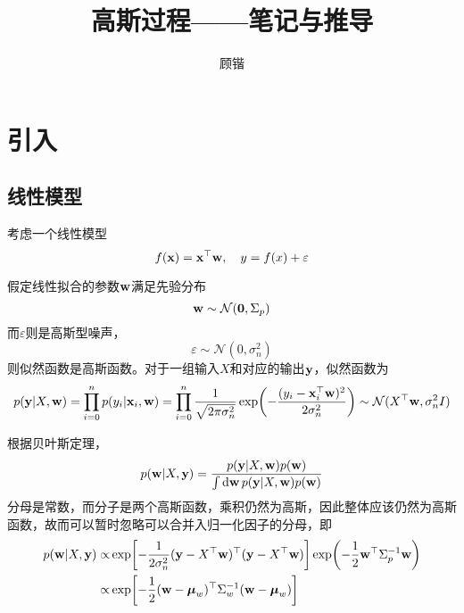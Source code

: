 \documentclass[12pt,UTF8]{article}
\begin{document}
    \title{高斯过程——笔记与推导}
    \author{顾锴}
    \maketitle

    \section{引入}
        \subsection{线性模型}
            考虑一个线性模型
            \begin{equation}
                f(\vb{x})=\vb{x}^\top\vb{w}\qc y=f(x)+\varepsilon
            \end{equation}\par
            假定线性拟合的参数$\vb{w}$满足先验分布
            \begin{equation}
                \vb{w}\sim\mathcal{N}(\vb{0},\Sigma_p)
            \end{equation}
            而$\varepsilon$则是高斯型噪声，
            \begin{equation}
                \varepsilon\sim\mathcal{N}(0,\sigma_n^2)
            \end{equation}
            则似然函数是高斯函数。对于一组输入$X$和对应的输出$\vb{y}$，似然函数为
            \begin{equation}
                p(\vb{y}|X,\vb{w})=\prod_{i=0}^n{p(y_i|\vb{x}_i,\vb{w})}=\prod_{i=0}^n{\frac{1}{\sqrt{2\pi\sigma_n^2}}\exp(-\frac{(y_i-\vb{x}_i^\top\vb{w})^2}{2\sigma_n^2})}\sim\mathcal{N}(X^\top\vb{w},\sigma_n^2I)
            \end{equation}\par
            根据贝叶斯定理，
            \begin{equation}
                p(\vb{w}|X,\vb{y})=\frac{p(\vb{y}|X,\vb{w})p(\vb{w})}{\int{\dd{\vb{w}}p(\vb{y}|X,\vb{w})p(\vb{w})}}
            \end{equation}
            分母是常数，而分子是两个高斯函数，乘积仍然为高斯，因此整体应该仍然为高斯函数，故而可以暂时忽略可以合并入归一化因子的分母，即
            \begin{align}
                p(\vb{w}|X,\vb{y})\propto&\exp[-\frac{1}{2\sigma_n^2}(\vb{y}-X^\top\vb{w})^\top(\vb{y}-X^\top\vb{w})]\exp(-\frac{1}{2}\vb{w}^\top\Sigma_p^{-1}\vb{w}) \\
                \propto&\exp[-\frac{1}{2}(\vb{w}-\vb*{\mu}_w)^\top\Sigma_w^{-1}(\vb{w}-\vb*{\mu}_w)]
            \end{align}
\end{document}

